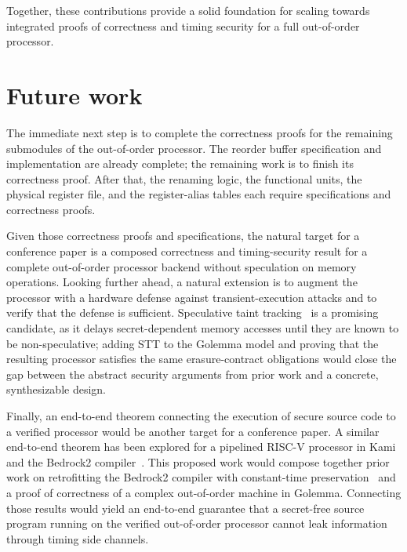 \documentclass[fontset=fira-newtxsf]{mitthesis}
\theoremstyle{definition}
\theoremstyle{plain}
\begin{document}
Together, these contributions provide a solid foundation for scaling towards integrated proofs of correctness and timing security for a full out-of-order processor.

\section{Future work}

The immediate next step is to complete the correctness proofs for the remaining submodules of the out-of-order processor.
The reorder buffer specification and implementation are already complete; the remaining work is to finish its correctness proof.
After that, the renaming logic, the functional units, the physical register file, and the register-alias tables each require specifications and correctness proofs.

Given those correctness proofs and specifications, the natural target for a conference paper is a composed correctness and timing-security result for a complete out-of-order processor backend without speculation on memory operations.
Looking further ahead, a natural extension is to augment the processor with a hardware defense against transient-execution attacks and to verify that the defense is sufficient.
Speculative taint tracking~\cite{yu2019} is a promising candidate, as it delays secret-dependent memory accesses until they are known to be non-speculative; adding STT to the Golemma model and proving that the resulting processor satisfies the same erasure-contract obligations would close the gap between the abstract security arguments from prior work and a concrete, synthesizable design.

Finally, an end-to-end theorem connecting the execution of secure source code to a verified processor would be another target for a conference paper.
A similar end-to-end theorem has been explored for a pipelined RISC-V processor in Kami and the Bedrock2 compiler~\cite{erbsen2021}.
This proposed work would compose together prior work on retrofitting the Bedrock2 compiler with constant-time preservation~\cite{conoly2025} and a proof of correctness of a complex out-of-order machine in Golemma.
Connecting those results would yield an end-to-end guarantee that a secret-free source program running on the verified out-of-order processor cannot leak information through timing side channels.



\end{document}
